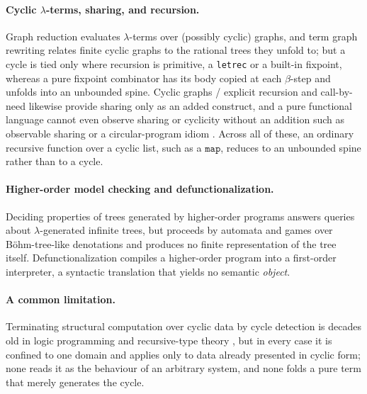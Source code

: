 \paragraph{Cyclic $\lambda$-terms, sharing, and recursion.}
Graph reduction  evaluates $\lambda$-terms over (possibly
cyclic) graphs, and term graph rewriting 
relates finite cyclic graphs to the rational trees they unfold to; but a cycle is tied only where
recursion is primitive, a \texttt{letrec} or a built-in fixpoint, whereas a pure fixpoint combinator
has its body copied at each $\beta$-step and unfolds into an unbounded spine. Cyclic graphs / explicit
recursion  and call-by-need  likewise provide sharing
only as an added construct, and a pure functional language cannot even observe sharing or cyclicity
without an addition such as observable sharing  or a circular-program idiom
. Across all of these, an ordinary recursive function over a cyclic list, such as a
$\mathtt{map}$, reduces to an unbounded spine rather than to a cycle.

\paragraph{Higher-order model checking and defunctionalization.}
Deciding properties of trees generated by higher-order programs 
answers queries about $\lambda$-generated infinite trees, but proceeds by automata and games over
B\"ohm-tree-like denotations and produces no finite representation of the tree itself.
Defunctionalization  compiles a higher-order program into a first-order
interpreter, a syntactic translation that yields no semantic \emph{object}.

\paragraph{A common limitation.}
Terminating structural computation over cyclic data by cycle detection is decades old in logic
programming  and recursive-type theory , but in every case it is confined to one domain and applies only to data already
presented in cyclic form; none reads it as the behaviour of an arbitrary system, and none folds a pure
term that merely generates the cycle.

